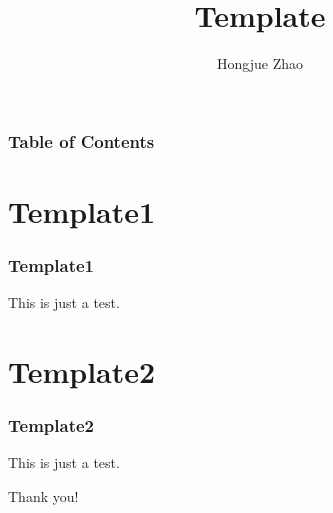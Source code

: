 \documentclass{beamer}
\title[template]{Template}
\author{Hongjue Zhao}
\institute{
	\inst{}
	College of Control Science and Engineering\\
	Zhejiang University
}
\begin{document}
\frame{\titlepage}
\begin{frame}
	\frametitle{Table of Contents}
	\tableofcontents
\end{frame}

\section{Template1}
\begin{frame}\label{slide:Template1}
    \frametitle{Template1}
    This is just a test.
\end{frame}

\section{Template2}
\begin{frame}\label{slide:Template2}
    \frametitle{Template2}
    This is just a test.
\end{frame}

\begin{frame}
	\Huge{\centerline{Thank you!}}
\end{frame}
\end{document}
